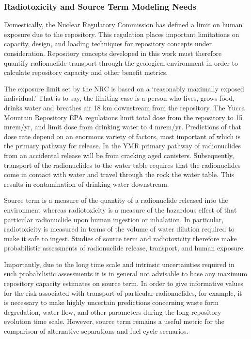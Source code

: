 \subsubsection{Radiotoxicity and Source Term Modeling Needs}

Domestically, the Nuclear Regulatory Commission has defined a limit on  
human exposure due to the repository. This regulation places important 
limitations on capacity, design, and loading techniques for repository 
concepts under consideration. Repository concepts developed in this 
work must therefore quantify radionuclide transport through the geological 
environment in order to calculate repository capacity and other 
benefit metrics. 

The exposure limit set by the NRC is based on a `reasonably maximally 
exposed individual.' That is to say, the limiting case is a person who lives, 
grows food, drinks water and breathes air 18 km downstream from the 
repository. The Yucca Mountain Repository \gls{EPA} regulations 
limit total dose from the repository to 15 mrem/yr, and limit dose 
from drinking water to 4 mrem/yr.  Predictions of that dose rate 
depend on an enormous variety of factors, most important of which is 
the primary pathway for release. In the \gls{YMR} primary pathway of 
radionuclides from an accidental release will be from cracking aged 
canisters. Subsequently, transport of the radionuclides to the water 
table requires that the radionuclides come in contact with water and travel 
through the rock the water table. This results in contamination of 
drinking water downstream.  

Source term is a measure of the quantity of a radionuclide released 
into the environment whereas radiotoxicity is a measure of the 
hazardous effect of that particular radionuclide upon human ingestion or 
inhalation. 
In particular, radiotoxicity is measured in terms of the volume of 
water dilution required to make it safe to ingest. Studies of source 
term and radiotoxicity therefore make probabilistic assessments of 
radionuclide release, transport, and human exposure.  

Importantly, due to the long time scale and intrinsic uncertainties 
required in such probabilistic assessments it is in general not 
advisable to base any maximum repository capacity estimates on source 
term.
In order to give informative values for the risk associated with 
transport of particular radionuclides, for example, it is necessary to 
make highly uncertain  predictions concerning waste form degredation, 
water flow, and other parameters during the long repository evolution 
time scale.  However, source term remains a useful metric for the comparison 
of alternative separations and fuel cycle scenarios.

